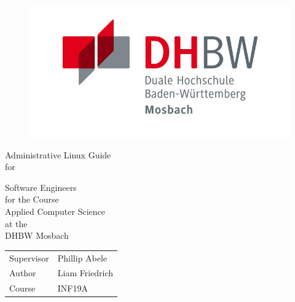 
\begin{titlepage}

    \begin{figure}[!tbp]
        \centering
        \includegraphics[width=0.9\linewidth]{graphics/dhbw_mosbach.png}
    \end{figure}

    \begin{center}

        \vspace*{1cm}

        \LARGE
        Administrative Linux Guide\\
        \vspace{0.8cm}
        \normalsize
        for
        
        \Large
        Software Engineers\\

        \normalsize
        \vspace{0.7cm}
        for the Course\\
        \Large
        Applied Computer Science\\
        \vspace{0.5cm}
        \normalsize
        at the\\
        \Large
        DHBW Mosbach\\

        \vfill

        \vspace{0.8cm}

        \begin{table}[h]
            \centering
            \begin{tabular}{ll}
                Supervisor & Phillip Abele\\
                Author & Liam Friedrich\\
                Course & INF19A
            \end{tabular}
        \end{table}

    \end{center}

\end{titlepage}
